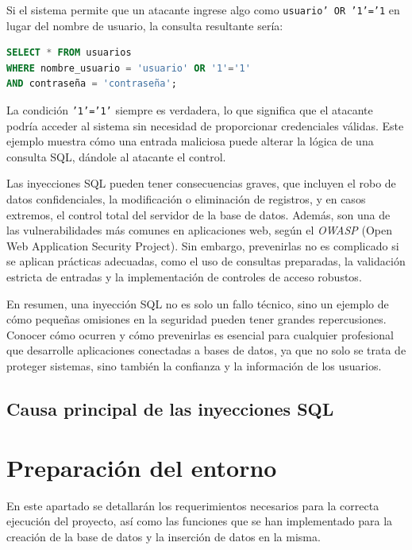 \documentclass[a4paper,12pt]{article}
\begin{document}
 Si el sistema permite que un atacante ingrese algo como \texttt{usuario' OR '1'='1} en lugar del nombre de usuario, la consulta resultante sería:
 \vspace{0,2cm}

 \begin{lstlisting}[language=SQL]
SELECT * FROM usuarios 
WHERE nombre_usuario = 'usuario' OR '1'='1' 
AND contraseña = 'contraseña';
\end{lstlisting}
\vspace{0,2cm}

 La condición \texttt{'1'='1'} siempre es verdadera, lo que significa que el atacante podría acceder al sistema sin necesidad de proporcionar credenciales válidas. Este ejemplo muestra cómo una entrada maliciosa puede alterar la lógica de una consulta SQL, dándole al atacante el control.
 \vspace{0,5cm}

 Las inyecciones SQL pueden tener consecuencias graves, que incluyen el robo de datos confidenciales, la modificación o eliminación de registros, y en casos extremos, el control total del servidor de la base de datos. Además, son una de las vulnerabilidades más comunes en aplicaciones web, según el \textit{OWASP} (Open Web Application Security Project). Sin embargo, prevenirlas no es complicado si se aplican prácticas adecuadas, como el uso de consultas preparadas, la validación estricta de entradas y la implementación de controles de acceso robustos.
 \vspace{0,5cm}

 En resumen, una inyección SQL no es solo un fallo técnico, sino un ejemplo de cómo pequeñas omisiones en la seguridad pueden tener grandes repercusiones. Conocer cómo ocurren y cómo prevenirlas es esencial para cualquier profesional que desarrolle aplicaciones conectadas a bases de datos, ya que no solo se trata de proteger sistemas, sino también la confianza y la información de los usuarios.
 
 \subsection {Causa principal de las inyecciones SQL}


\section{Preparación del entorno}
En este apartado se detallarán los requerimientos necesarios para la correcta ejecución del proyecto, 
así como las funciones que se han implementado para la creación de la base de datos y la inserción de datos en la misma.
\end{document}
